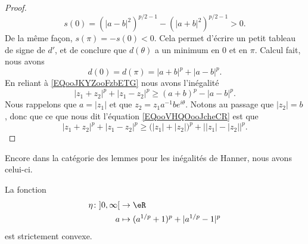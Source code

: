 \begin{proof}
    \begin{equation}
        s(0)=\left( | a-b |^2 \right)^{p/2-1}-\left( | a+b |^2 \right)^{p/2-1}>0.
    \end{equation}
    De la même façon, \( s(\pi)=-s(0)<0\). Cela permet d'écrire un petit tableau de signe de \( d'\), et de conclure que \( d(\theta)\) a un minimum en \( 0\) et en \( \pi\). Calcul fait, nous avons
    \begin{equation}
        d(0)=d(\pi)=| a+b |^p+| a-b |^p.
    \end{equation}
    En reliant à \eqref{EQooJKYZooFzbETG} nous avons l'inégalité
    \begin{equation}        \label{EQooVHQOooJcheCR}
        | z_1+z_2 |^p+| z_1-z_2 |^p\geq (a+b)^p-| a-b |^p.
    \end{equation}
    Nous rappelons que \( a=| z_1 |\) et que \( z_2=z_1a^{-1}b e^{i\theta}\). Notons au passage que \( | z_2 |=b\), donc que ce que nous dit l'équation \eqref{EQooVHQOooJcheCR} est que
    \begin{equation}    
        | z_1+z_2 |^p+| z_1-z_2 |^p\geq \big( | z_1 |+| z_2 | \big)^p+\big| | z_1 |-| z_2 | \big|^p.
    \end{equation}
\end{proof}

Encore dans la catégorie des lemmes pour les inégalités de Hanner, nous avons celui-ci.
\begin{lemma}     \label{LEMooTCNEooADpNai}
    La fonction
    \begin{equation}
        \begin{aligned}
        \eta\colon \mathopen] 0 , \infty \mathclose[&\to \eR \\
            a&\mapsto (a^{1/p}+1)^p+| a^{1/p}-1 |^p 
        \end{aligned}
    \end{equation}
    est strictement convexe.
\end{lemma}

